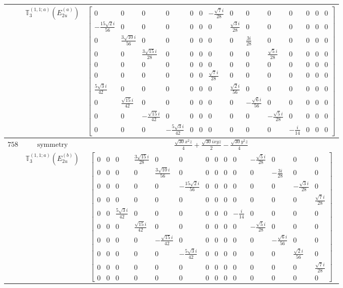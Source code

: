 \documentclass[fleqn,8pt,landscape]{jsarticle}
\begin{document}
\begin{longtable}{ccc}
$  $ & $ \mathbb{T}_{3}^{(1,1;a)}(E_{2u}^{(a)}) $ & $ \begin{bmatrix} 0 & 0 & 0 & 0 & 0 & 0 & - \frac{\sqrt{7} i}{28} & 0 & 0 & 0 & 0 & 0 & 0 & 0 \\ - \frac{15 \sqrt{2} i}{56} & 0 & 0 & 0 & 0 & 0 & 0 & \frac{\sqrt{3} i}{28} & 0 & 0 & 0 & 0 & 0 & 0 \\ 0 & \frac{3 \sqrt{10} i}{56} & 0 & 0 & 0 & 0 & 0 & 0 & \frac{3 i}{28} & 0 & 0 & 0 & 0 & 0 \\ 0 & 0 & \frac{3 \sqrt{15} i}{28} & 0 & 0 & 0 & 0 & 0 & 0 & \frac{\sqrt{5} i}{28} & 0 & 0 & 0 & 0 \\ 0 & 0 & 0 & 0 & 0 & 0 & 0 & 0 & 0 & 0 & 0 & 0 & 0 & 0 \\ 0 & 0 & 0 & 0 & 0 & 0 & \frac{\sqrt{7} i}{28} & 0 & 0 & 0 & 0 & 0 & 0 & 0 \\ \frac{5 \sqrt{3} i}{42} & 0 & 0 & 0 & 0 & 0 & 0 & \frac{\sqrt{2} i}{56} & 0 & 0 & 0 & 0 & 0 & 0 \\ 0 & \frac{\sqrt{15} i}{42} & 0 & 0 & 0 & 0 & 0 & 0 & - \frac{\sqrt{6} i}{56} & 0 & 0 & 0 & 0 & 0 \\ 0 & 0 & - \frac{\sqrt{15} i}{42} & 0 & 0 & 0 & 0 & 0 & 0 & - \frac{\sqrt{5} i}{28} & 0 & 0 & 0 & 0 \\ 0 & 0 & 0 & - \frac{5 \sqrt{3} i}{42} & 0 & 0 & 0 & 0 & 0 & 0 & - \frac{i}{14} & 0 & 0 & 0 \end{bmatrix} $ \\ \hline
$ 758 $ & $ \text{symmetry} $ & $ \frac{\sqrt{30} x^{2} z}{4} + \frac{\sqrt{30} i x y z}{2} - \frac{\sqrt{30} y^{2} z}{4} $ \\
$  $ & $ \mathbb{T}_{3}^{(1,1;a)}(E_{2u}^{(b)}) $ & $ \begin{bmatrix} 0 & 0 & 0 & \frac{3 \sqrt{15} i}{28} & 0 & 0 & 0 & 0 & 0 & 0 & - \frac{\sqrt{5} i}{28} & 0 & 0 & 0 \\ 0 & 0 & 0 & 0 & \frac{3 \sqrt{10} i}{56} & 0 & 0 & 0 & 0 & 0 & 0 & - \frac{3 i}{28} & 0 & 0 \\ 0 & 0 & 0 & 0 & 0 & - \frac{15 \sqrt{2} i}{56} & 0 & 0 & 0 & 0 & 0 & 0 & - \frac{\sqrt{3} i}{28} & 0 \\ 0 & 0 & 0 & 0 & 0 & 0 & 0 & 0 & 0 & 0 & 0 & 0 & 0 & \frac{\sqrt{7} i}{28} \\ 0 & 0 & \frac{5 \sqrt{3} i}{42} & 0 & 0 & 0 & 0 & 0 & 0 & - \frac{i}{14} & 0 & 0 & 0 & 0 \\ 0 & 0 & 0 & \frac{\sqrt{15} i}{42} & 0 & 0 & 0 & 0 & 0 & 0 & - \frac{\sqrt{5} i}{28} & 0 & 0 & 0 \\ 0 & 0 & 0 & 0 & - \frac{\sqrt{15} i}{42} & 0 & 0 & 0 & 0 & 0 & 0 & - \frac{\sqrt{6} i}{56} & 0 & 0 \\ 0 & 0 & 0 & 0 & 0 & - \frac{5 \sqrt{3} i}{42} & 0 & 0 & 0 & 0 & 0 & 0 & \frac{\sqrt{2} i}{56} & 0 \\ 0 & 0 & 0 & 0 & 0 & 0 & 0 & 0 & 0 & 0 & 0 & 0 & 0 & \frac{\sqrt{7} i}{28} \\ 0 & 0 & 0 & 0 & 0 & 0 & 0 & 0 & 0 & 0 & 0 & 0 & 0 & 0 \end{bmatrix} $ \\ \hline

\end{longtable}
\end{document}

